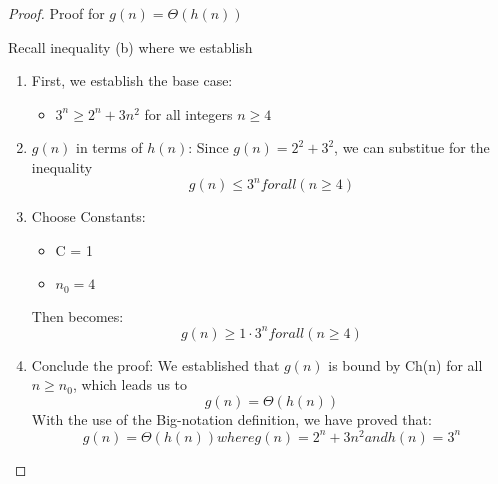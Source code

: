 \documentclass[11pt]{article}
\newcounter{prnum}
\newenvironment{problem}{{\vskip 0.2in\noindent\bf Problem
       \addtocounter{prnum}{1} \arabic{prnum}.}}{\vskip 0.1in}
\begin{document}
\begin{problem}
  \begin{proof}
  Proof for $g(n) = \Theta(h(n))$

    \item Recall inequality (b) where we establish
    \begin{enumerate}
        \item First, we establish the base case:
        \begin{itemize}
          \item $3^n \geq 2^n + 3n^2$ for all integers $n \geq 4$ 
        \end{itemize}
      \item $g(n)$ in terms of $h(n)$: Since $g(n) = 2^2 + 3^2$,
        we can substitue for the inequality
        \begin{equation}
          g(n) \leq 3^n for all (n\geq4)
        \end{equation}

      \item Choose Constants:
        \begin{itemize}
          \item C = 1
          \item $n_0 = 4$
        \end{itemize}
        Then becomes: 
        \begin{equation*}
          g(n) \geq 1\cdot3^n for all (n\geq4)
        \end{equation*}
      \item Conclude the proof: We established that $g(n)$ 
        is bound by C\cdot h(n) for all $n\geq n_0$, which leads us to 
        \begin{equation} 
          g(n) = \Theta(h(n))
        \end{equation}
With the use of the Big-\Theta notation definition, we have proved that:
\begin{equation}
  g(n) = \Theta(h(n)) where g(n) = 2^n + 3n^2
  and 
  h(n) = 3^n
\end{equation}
    \end{enumerate} 
  \end{proof}
\end{problem}

\clearpage
\end{document}
